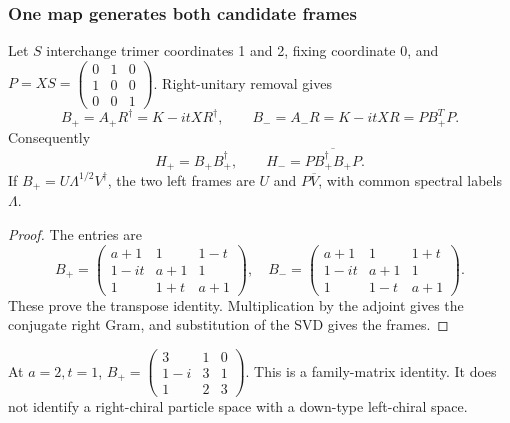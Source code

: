 \documentclass[11pt,a4paper]{article}
\begin{document}
\subsubsection{One map generates both candidate frames}
\begin{theorem}
\label{p6:thm:v585-one-parent-frames}
Let $S$ interchange trimer coordinates 1 and 2, fixing coordinate 0, and
$P=XS=\left(\begin{smallmatrix}0&1&0\\1&0&0\\0&0&1\end{smallmatrix}\right)$.
Right-unitary removal gives
\[
 B_+=A_+R^\dagger=K-itXR^\dagger,
 \qquad B_-=A_-R=K-itXR=PB_+^TP.
\]
Consequently
\[
 H_+=B_+B_+^\dagger,\qquad
 H_-=P\overline{B_+^\dagger B_+}P.
\]
If $B_+=U\Lambda^{1/2}V^\dagger$, the two left frames are $U$ and
$P\overline V$, with common spectral labels $\Lambda$.
\end{theorem}
\begin{proof}
The entries are
\[
 B_+=\begin{pmatrix}a+1&1&1-t\\1-it&a+1&1\\1&1+t&a+1\end{pmatrix},\quad
 B_-=\begin{pmatrix}a+1&1&1+t\\1-it&a+1&1\\1&1-t&a+1\end{pmatrix}.
\]
These prove the transpose identity. Multiplication by the adjoint gives
the conjugate right Gram, and substitution of the SVD gives the frames.
\end{proof}
At $a=2,t=1$, $B_+=\left(\begin{smallmatrix}3&1&0\\1-i&3&1\\1&2&3\end{smallmatrix}\right)$.
This is a family-matrix identity. It does not identify a right-chiral
particle space with a down-type left-chiral space.
\end{document}
